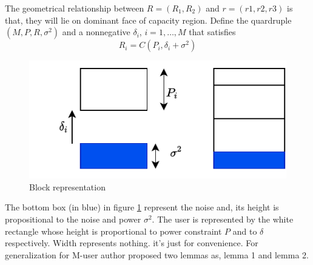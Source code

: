 \documentclass{article}
\begin{document}
The geometrical relationship between $R = (R_1, R_2)$ and $r = (r1,r2,r3)$ is that, they will lie on dominant face of capacity region. Define the quardruple $\left( M, P, R, \sigma^2\right)$ and a nonnegative $\delta_i$, $i = 1, \dots , M$ that satisfies
\begin{equation}
	R_i = C(P_i, \delta_i+\sigma^2)
\end{equation}
\begin{figure}[htb!]
\begin{center}
\includegraphics[height=.2\textheight]{pic_6.pdf}
\caption{Block representation}
\label{fig6}
\end{center}
\end{figure}
The bottom box (in blue) in figure \ref{fig6} represent the noise and, its height is propositional to the noise and power $\sigma^2$. The user is represented by the white rectangle whose height is proportional to power constraint $P$ and to $\delta$ respectively. Width represents nothing. it's just for convenience. \newline
For generalization for M-user author proposed two lemmas as, lemma 1 and lemma 2.
\end{document}

